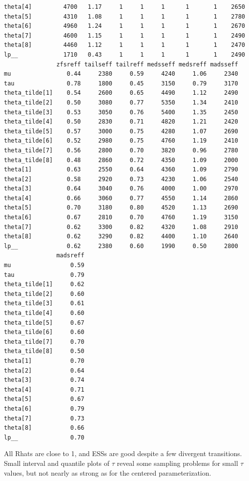 \documentclass[american,]{article}
\begin{document}
\begin{verbatim}
theta[4]         4700   1.17     1     1     1      1       1    2650
theta[5]         4310   1.08     1     1     1      1       1    2780
theta[6]         4960   1.24     1     1     1      1       1    2670
theta[7]         4600   1.15     1     1     1      1       1    2490
theta[8]         4460   1.12     1     1     1      1       1    2470
lp__             1710   0.43     1     1     1      1       1    2490
               zfsreff tailseff tailreff medsseff medsreff madsseff
mu                0.44     2380     0.59     4240     1.06     2340
tau               0.78     1800     0.45     3150     0.79     3170
theta_tilde[1]    0.54     2600     0.65     4490     1.12     2490
theta_tilde[2]    0.50     3080     0.77     5350     1.34     2410
theta_tilde[3]    0.53     3050     0.76     5400     1.35     2450
theta_tilde[4]    0.50     2830     0.71     4820     1.21     2420
theta_tilde[5]    0.57     3000     0.75     4280     1.07     2690
theta_tilde[6]    0.52     2980     0.75     4760     1.19     2410
theta_tilde[7]    0.56     2800     0.70     3820     0.96     2780
theta_tilde[8]    0.48     2860     0.72     4350     1.09     2000
theta[1]          0.63     2550     0.64     4360     1.09     2790
theta[2]          0.58     2920     0.73     4230     1.06     2540
theta[3]          0.64     3040     0.76     4000     1.00     2970
theta[4]          0.66     3060     0.77     4550     1.14     2860
theta[5]          0.70     3180     0.80     4520     1.13     2690
theta[6]          0.67     2810     0.70     4760     1.19     3150
theta[7]          0.62     3300     0.82     4320     1.08     2910
theta[8]          0.62     3290     0.82     4400     1.10     2640
lp__              0.62     2380     0.60     1990     0.50     2800
               madsreff
mu                 0.59
tau                0.79
theta_tilde[1]     0.62
theta_tilde[2]     0.60
theta_tilde[3]     0.61
theta_tilde[4]     0.60
theta_tilde[5]     0.67
theta_tilde[6]     0.60
theta_tilde[7]     0.70
theta_tilde[8]     0.50
theta[1]           0.70
theta[2]           0.64
theta[3]           0.74
theta[4]           0.71
theta[5]           0.67
theta[6]           0.79
theta[7]           0.73
theta[8]           0.66
lp__               0.70
\end{verbatim}

All Rhats are close to 1, and ESSs are good despite a few divergent
transitions. Small interval and quantile plots of $\tau$ reveal
some sampling problems for small $\tau$ values, but not nearly as
strong as for the centered parameterization.
\end{document}
